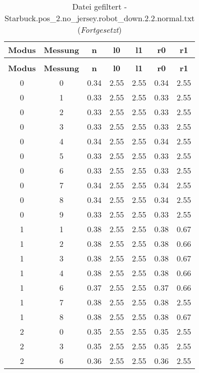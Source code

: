 \begin{longtable}{|c|c||c||c|c||c|c|}
	\caption{Datei gefiltert - Starbuck.pos\_2.no\_jersey.robot\_down.2.2.normal.txt} \label{tab:Starbuck.pos-2.no-jersey.robot-down.2.2.normal.txt} \\ \hline
	\textbf{Modus} & \textbf{Messung} & \textbf{n} & \textbf{l0} & \textbf{l1} & \textbf{r0} & \textbf{r1}\\ \hline
	\endfirsthead
	\caption[]{Datei gefiltert - Starbuck.pos\_2.no\_jersey.robot\_down.2.2.normal.txt (\emph{Fortgesetzt})} \\ \hline
	\textbf{Modus} & \textbf{Messung} & \textbf{n} & \textbf{l0} & \textbf{l1} & \textbf{r0} & \textbf{r1}\\ \hline
	\endhead
	0 & 0 & 0.34 & 2.55 & 2.55 & 0.34 & 2.55 \\ \hline
	0 & 1 & 0.33 & 2.55 & 2.55 & 0.33 & 2.55 \\ \hline
	0 & 2 & 0.33 & 2.55 & 2.55 & 0.33 & 2.55 \\ \hline
	0 & 3 & 0.33 & 2.55 & 2.55 & 0.33 & 2.55 \\ \hline
	0 & 4 & 0.34 & 2.55 & 2.55 & 0.34 & 2.55 \\ \hline
	0 & 5 & 0.33 & 2.55 & 2.55 & 0.33 & 2.55 \\ \hline
	0 & 6 & 0.33 & 2.55 & 2.55 & 0.33 & 2.55 \\ \hline
	0 & 7 & 0.34 & 2.55 & 2.55 & 0.34 & 2.55 \\ \hline
	0 & 8 & 0.34 & 2.55 & 2.55 & 0.34 & 2.55 \\ \hline
	0 & 9 & 0.33 & 2.55 & 2.55 & 0.33 & 2.55 \\ \hline
	1 & 1 & 0.38 & 2.55 & 2.55 & 0.38 & 0.67 \\ \hline
	1 & 2 & 0.38 & 2.55 & 2.55 & 0.38 & 0.66 \\ \hline
	1 & 3 & 0.38 & 2.55 & 2.55 & 0.38 & 0.67 \\ \hline
	1 & 4 & 0.38 & 2.55 & 2.55 & 0.38 & 0.66 \\ \hline
	1 & 6 & 0.37 & 2.55 & 2.55 & 0.37 & 0.66 \\ \hline
	1 & 7 & 0.38 & 2.55 & 2.55 & 0.38 & 2.55 \\ \hline
	1 & 8 & 0.38 & 2.55 & 2.55 & 0.38 & 0.67 \\ \hline
	2 & 0 & 0.35 & 2.55 & 2.55 & 0.35 & 2.55 \\ \hline
	2 & 3 & 0.35 & 2.55 & 2.55 & 0.35 & 2.55 \\ \hline
	2 & 6 & 0.36 & 2.55 & 2.55 & 0.36 & 2.55 \\ \hline

\end{longtable}
